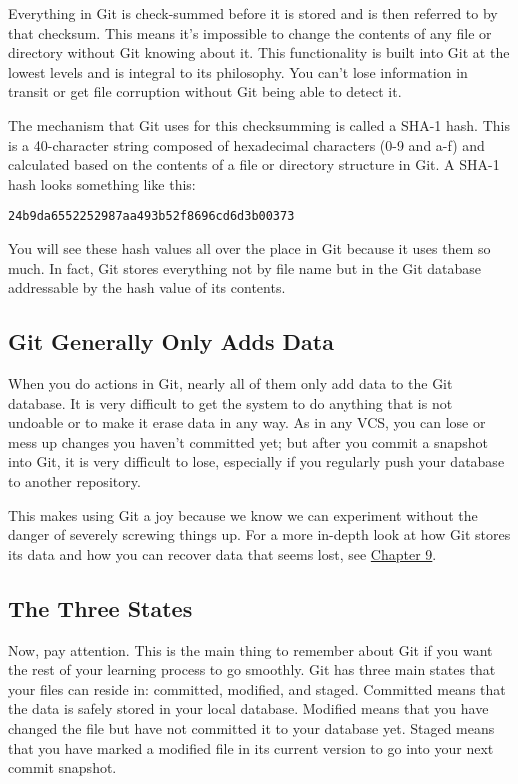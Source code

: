 \documentclass[a4paper]{book}
\newcounter{tab}[chapter]
\newcommand{\prechap}{Chapter }
\newcommand{\postchap}{}
\newcommand{\chapref}[1]{\hyperref[chap:#1]{\prechap #1\postchap}}
\begin{document}
Everything in Git is check-summed before it is stored and is then referred to by that checksum. This means it's impossible to change the contents of any file or directory without Git knowing about it. This functionality is built into Git at the lowest levels and is integral to its philosophy. You can't lose information in transit or get file corruption without Git being able to detect it.

The mechanism that Git uses for this checksumming is called a SHA-1 hash. This is a 40-character string composed of hexadecimal characters (0-9 and a-f) and calculated based on the contents of a file or directory structure in Git. A SHA-1 hash looks something like this:

\begin{shaded}\begin{verbatim}
24b9da6552252987aa493b52f8696cd6d3b00373
\end{verbatim}\end{shaded}

You will see these hash values all over the place in Git because it uses them so much. In fact, Git stores everything not by file name but in the Git database addressable by the hash value of its contents.

\subsection{Git Generally Only Adds Data}

When you do actions in Git, nearly all of them only add data to the Git database. It is very difficult to get the system to do anything that is not undoable or to make it erase data in any way. As in any VCS, you can lose or mess up changes you haven't committed yet; but after you commit a snapshot into Git, it is very difficult to lose, especially if you regularly push your database to another repository.

This makes using Git a joy because we know we can experiment without the danger of severely screwing things up. For a more in-depth look at how Git stores its data and how you can recover data that seems lost, see \chapref{9}.

\subsection{The Three States}

Now, pay attention. This is the main thing to remember about Git if you want the rest of your learning process to go smoothly. Git has three main states that your files can reside in: committed, modified, and staged. Committed means that the data is safely stored in your local database. Modified means that you have changed the file but have not committed it to your database yet. Staged means that you have marked a modified file in its current version to go into your next commit snapshot.
\end{document}
